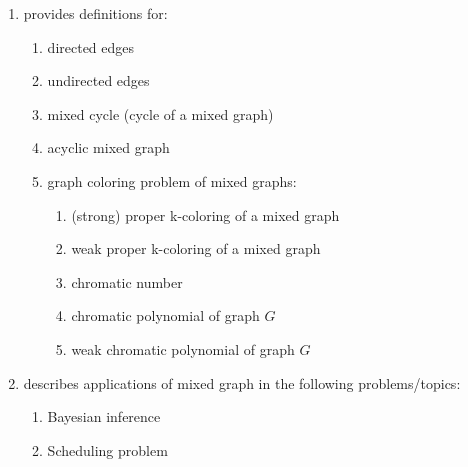 \begin{enumerate}
\begin{enumerate}
	\item \cite{WikipediaContributors2018a50} provides definitions for: \vspace{-0.2cm}
		\begin{enumerate} \itemsep -2pt
		\item directed edges
		\item undirected edges
		\item mixed cycle (cycle of a mixed graph)
		\item acyclic mixed graph
		\item graph coloring problem of mixed graphs: \vspace{-0.1cm}
			\begin{enumerate} \itemsep -1pt
			\item (strong) proper k-coloring of a mixed graph
			\item weak proper k-coloring of a mixed graph
			\item chromatic number
			\item chromatic polynomial of graph $G$
			\item weak chromatic polynomial of graph $G$
			\end{enumerate}
		\end{enumerate}
	\item \cite{WikipediaContributors2018a50} describes applications of mixed graph in the following problems/topics: \vspace{-0.2cm}
		\begin{enumerate} \itemsep -2pt
		\item Bayesian inference
		\item Scheduling problem
		\end{enumerate}
	\end{enumerate}
\end{enumerate}







